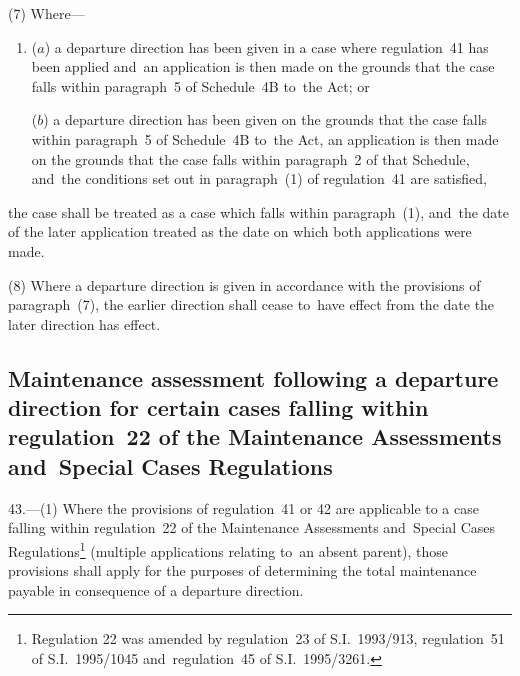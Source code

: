 \documentclass[12pt,a4paper]{article}
\begin{document}
(7) Where—
\begin{enumerate}\item[]
($a$) a departure direction has been given in a case where regulation~41 has been applied and~an application is then made on the grounds that the case falls within paragraph~5 of Schedule~4B to~the Act; or

($b$) a departure direction has been given on the grounds that the case falls within paragraph~5 of Schedule~4B to~the Act, an application is then made on the grounds that the case falls within paragraph~2 of that Schedule, and~the conditions set out in paragraph~(1) of regulation~41 are satisfied,
\end{enumerate}
the case shall be treated as a case which falls within paragraph~(1), and~the date of the later application treated as the date on which both applications were made.

(8) Where a departure direction is given in accordance with the provisions of paragraph~(7), the earlier direction shall cease to~have effect from the date the later direction has effect.


\subsection[43. Maintenance assessment following a departure direction for certain cases falling
within regulation~22 of the Maintenance Assessments and~Special Cases
Regulations]{Maintenance assessment following a departure direction for certain cases falling
within regulation~22 of the Maintenance Assessments and~Special Cases
Regulations}

43.—(1) Where the provisions of regulation~41 or 42 are applicable to
a case falling within regulation~22 of the Maintenance Assessments and~Special
Cases Regulations\footnote{\frenchspacing Regulation 22 was amended by regulation~23 of S.I.~1993/913, regulation~51 of S.I.~1995/1045 and~regulation~45 of S.I.~1995/3261.} (multiple applications relating to~an absent parent),
those provisions shall apply for the purposes of determining the total
maintenance payable in consequence of a departure direction.
\end{document}
